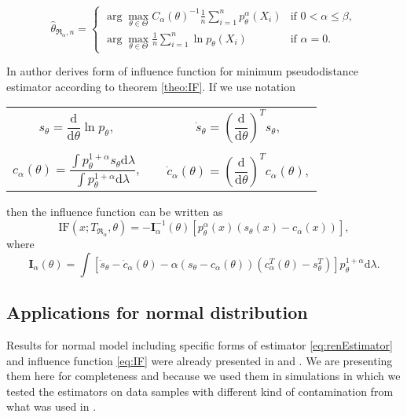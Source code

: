 \begin{equation}
	\hat{\theta}_{\mathfrak{R}_\alpha,n} =
	\begin{cases}
		\displaystyle{ \arg \max_{\theta \in \Theta} C_\alpha\left( \theta \right)^{-1} \frac{1}{n} \sum_{i=1}^n p_{\theta}^{\alpha}\left( X_i \right) } & \text{if } 0 < \alpha \leq \beta, \\
		\displaystyle{ \arg \max_{\theta \in \Theta}  \frac{1}{n} \sum_{i=1}^n \ln p_{\theta}\left( X_i \right) } & \text{if } \alpha = 0.
	\end{cases}	
	\label{eq:renEstimator}
\end{equation}
		
In \cite{Vajda2009} author derives form of influence function for minimum \ren pseudodistance estimator according to theorem \ref{theo:IF}. If we use notation 
\begin{center}
	\begin{tabular}{c c}
	$s_\theta = \dfrac{\mathrm{d}}{\mathrm{d}\theta} \ln p_\theta, \quad$ & $ \dot{s}_\theta = \left( \dfrac{\mathrm{d}}{\mathrm{d}\theta} \right)^T s_\theta,$ \\ 
	&\\
	$c_\alpha(\theta) = \dfrac{\int p_\theta^{1+\alpha}s_\theta \mathrm{d}\lambda}{\int p_\theta^{1+\alpha} \mathrm{d}\lambda}, \quad$ & $\dot{c}_\alpha(\theta)= \left( \dfrac{\mathrm{d}}{\mathrm{d}\theta} \right)^T c_\alpha(\theta),$  \\ 
	\end{tabular} 
\end{center}
then the influence function can be written as
\begin{equation}
	\mathrm{IF}(x;T_{\mathfrak{R}_\alpha},\theta) = -\mathbf{I}^{-1}_{\alpha}(\theta) \left[ p_\theta^\alpha(x) (s_\theta (x) - c_\alpha (x)) \right], 
	\label{eq:IF}
\end{equation}
where 
\begin{equation}
\mathbf{I}_{\alpha}(\theta) = \int{ \left[\dot{s}_\theta - \dot{c}_\alpha(\theta) - \alpha(s_\theta - c_\alpha(\theta))(c^T_\alpha(\theta) - s^T_\theta) \right] p_\theta^{1+\alpha} \mathrm{d}\lambda}.
\end{equation}

\subsection{Applications for normal distribution}

Results for normal model including specific forms of estimator \eqref{eq:renEstimator} and influence function \eqref{eq:IF} were already presented in \cite{Vajda2009} and \cite{Demut2010}. We are presenting them here for completeness and because we used them in simulations in which we tested the estimators on data samples with different kind of contamination from what was used in \cite{Demut2010}. 


